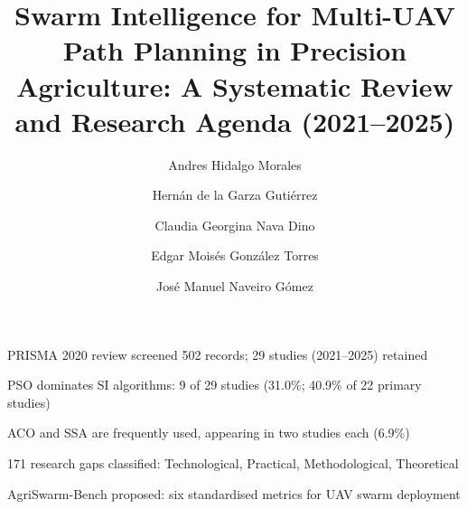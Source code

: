 \documentclass[review,3p]{elsarticle}
\begin{document}
\begin{frontmatter}

\begin{highlights}
\item PRISMA 2020 review screened 502 records; 29 studies (2021--2025) retained
\item PSO dominates SI algorithms: 9 of 29 studies (31.0\%; 40.9\% of 22 primary studies)
\item ACO and SSA are frequently used, appearing in two studies each (6.9\%)
\item 171 research gaps classified: Technological, Practical, Methodological, Theoretical
\item AgriSwarm-Bench proposed: six standardised metrics for UAV swarm deployment
\end{highlights}

\title{Swarm Intelligence for Multi-UAV Path Planning in Precision Agriculture:
A Systematic Review and Research Agenda (2021--2025)}

\author{\texorpdfstring{Andres Hidalgo Morales}{Andres Hidalgo Morales}}

\author{\texorpdfstring{Hernán de la Garza Gutiérrez}{Hernan de la Garza Gutierrez}}

\author{\texorpdfstring{Claudia Georgina Nava Dino}{Claudia Georgina Nava Dino}}

\author{\texorpdfstring{Edgar Moisés González Torres}{Edgar Moises Gonzalez Torres}}

\author{\texorpdfstring{José Manuel Naveiro Gómez}{Jose Manuel Naveiro Gomez}}



\end{frontmatter}
\end{document}
